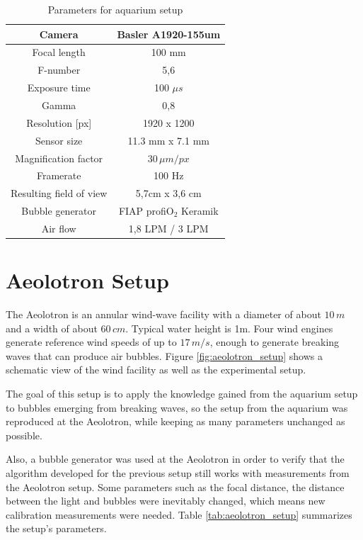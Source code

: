 		\begin{table}[h]
			\centering
		
			\begin{tabular}{|c|c|}
			\hline 
			Camera & Basler A1920-155um \\ 
			\hline 
			Focal length & 100 mm \\ 
			\hline 
			F-number & 5,6 \\ 
			\hline 
			Exposure time & 100 $\mu s$ \\ 
			\hline 
			Gamma & 0,8 \\
			\hline
			Resolution [px] &1920 x 1200 \\
			\hline 
			Sensor size & 11.3 mm x 7.1 mm \\
			\hline 
			Magnification factor & $30 \, \mu m/px$ \\ 
			\hline 
			Framerate & 100 Hz \\ 
			\hline 
			Resulting field of view & 5,7cm x 3,6 cm \\
			\hline
			Bubble generator & FIAP profiO$_2$ Keramik\\			
			\hline
			Air flow & 1,8 LPM / 3 LPM \\ 
			\hline
			\end{tabular} 
			
			\caption{Parameters for aquarium setup}
			\label{tab:aquarium_param}

		\end{table}
		
	\section{Aeolotron Setup}\label{aeolotron_setup}
		The Aeolotron is an annular wind-wave facility with a diameter of about $10 \, m$ and a width of about $60 \, cm$. Typical water height is 1m. Four wind engines generate reference wind speeds of up to $17 \, m/s$, enough to generate breaking waves that can produce air bubbles. Figure \ref{fig:aeolotron_setup} shows a schematic view of the wind facility as well as the experimental setup.
		
		The goal of this setup is to apply the knowledge gained from the aquarium setup to bubbles emerging from breaking waves, so the setup from the aquarium was reproduced at the Aeolotron, while keeping as many parameters unchanged as possible.
		
	Also, a bubble generator was used at the Aeolotron in order to verify that the algorithm developed for the previous setup still works with measurements from the Aeolotron setup. Some parameters such as the focal distance, the distance between the light and bubbles were inevitably changed, which means new calibration measurements were needed. Table \ref{tab:aeolotron_setup} summarizes the setup's parameters.
	
